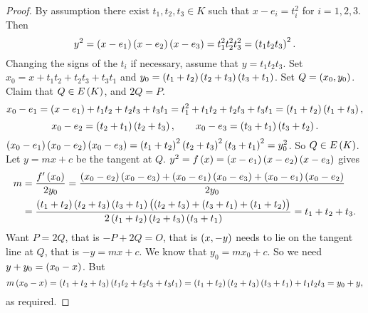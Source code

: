 \begin{proof}
By assumption there exist $ t_1, t_2, t_3 \in K $ such that $ x - e_i = t_i^2 $ for $ i = 1, 2, 3 $. Then
$$ y^2 = \br{x - e_1}\br{x - e_2}\br{x - e_3} = t_1^2t_2^2t_3^2 = \br{t_1t_2t_3}^2. $$
Changing the signs of the $ t_i $ if necessary, assume that $ y = t_1t_2t_3 $. Set $ x_0 = x + t_1t_2 + t_2t_3 + t_3t_1 $ and $ y_0 = \br{t_1 + t_2}\br{t_2 + t_3}\br{t_3 + t_1} $. Set $ Q = \br{x_0, y_0} $. Claim that $ Q \in E\br{K} $, and $ 2Q = P $.
$$ x_0 - e_1 = \br{x - e_1} + t_1t_2 + t_2t_3 + t_3t_1 = t_1^2 + t_1t_2 + t_2t_3 + t_3t_1 = \br{t_1 + t_2}\br{t_1 + t_3}, $$
$$ x_0 - e_2 = \br{t_2 + t_1}\br{t_2 + t_3}, \qquad x_0 - e_3 = \br{t_3 + t_1}\br{t_3 + t_2}. $$
$ \br{x_0 - e_1}\br{x_0 - e_2}\br{x_0 - e_3} = \br{t_1 + t_2}^2\br{t_2 + t_3}^2\br{t_3 + t_1}^2 = y_0^2 $. So $ Q \in E\br{K} $. Let $ y = mx + c $ be the tangent at $ Q $. $ y^2 = f\br{x} = \br{x - e_1}\br{x - e_2}\br{x - e_3} $ gives
\begin{align*}
m
& = \dfrac{f'\br{x_0}}{2y_0} = \dfrac{\br{x_0 - e_2}\br{x_0 - e_3} + \br{x_0 - e_1}\br{x_0 - e_3} + \br{x_0 - e_1}\br{x_0 - e_2}}{2y_0} \\
& = \dfrac{\br{t_1 + t_2}\br{t_2 + t_3}\br{t_3 + t_1}\br{\br{t_2 + t_3} + \br{t_3 + t_1} + \br{t_1 + t_2}}}{2\br{t_1 + t_2}\br{t_2 + t_3}\br{t_3 + t_1}} = t_1 + t_2 + t_3.
\end{align*}
Want $ P = 2Q $, that is $ -P + 2Q = O $, that is $ \br{x, -y} $ needs to lie on the tangent line at $ Q $, that is $ -y = mx + c $. We know that $ y_0 = mx_0 + c $. So we need $ y + y_0 = \br{x_0 - x} $. But
$$ m\br{x_0 - x} = \br{t_1 + t_2 + t_3}\br{t_1t_2 + t_2t_3 + t_3t_1} = \br{t_1 + t_2}\br{t_2 + t_3}\br{t_3 + t_1} + t_1t_2t_3 = y_0 + y, $$
as required.
\end{proof}

